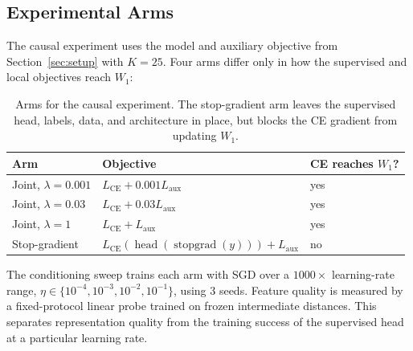 \subsection{Experimental Arms}
The causal experiment uses the model and auxiliary objective from
Section~\ref{sec:setup} with $K=25$. Four arms differ only in how the
supervised and local objectives reach $W_1$:
\begin{table}[h]
\centering
\begin{tabular}{lll}
\toprule
Arm & Objective & CE reaches $W_1$? \\
\midrule
Joint, $\lambda=0.001$ &
$L_{\mathrm{CE}}+0.001L_{\mathrm{aux}}$ & yes \\
Joint, $\lambda=0.03$ &
$L_{\mathrm{CE}}+0.03L_{\mathrm{aux}}$ & yes \\
Joint, $\lambda=1$ &
$L_{\mathrm{CE}}+L_{\mathrm{aux}}$ & yes \\
Stop-gradient &
$L_{\mathrm{CE}}(\operatorname{head}(\operatorname{stopgrad}(y)))+
L_{\mathrm{aux}}$ & no \\
\bottomrule
\end{tabular}
\caption{Arms for the causal experiment. The stop-gradient arm leaves the
supervised head, labels, data, and architecture in place, but blocks the CE
gradient from updating $W_1$.}
\label{tab:exp4-arms}
\end{table}
The conditioning sweep trains each arm with SGD over a $1000\times$
learning-rate range, $\eta\in\{10^{-4},10^{-3},10^{-2},10^{-1}\}$, using 3
seeds. Feature quality is measured by a fixed-protocol linear probe trained on
frozen intermediate distances. This separates representation quality from the
training success of the supervised head at a particular learning rate.


